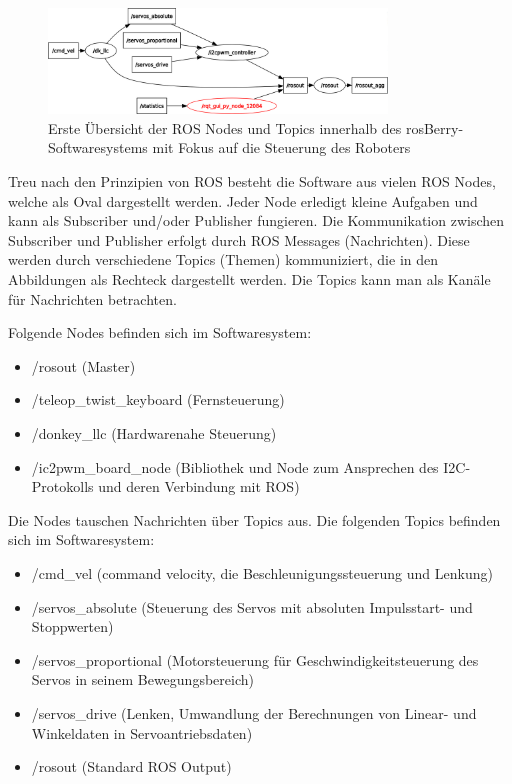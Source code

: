 \documentclass[conference]{IEEEtran}
\begin{document}
	\begin{figure}[!ht] 
		\centering
		\includegraphics[width=9cm]{img/rosgraph.png}
		\caption{Erste Übersicht der ROS Nodes und Topics innerhalb des rosBerry-Softwaresystems mit Fokus auf die Steuerung des Roboters}
		\label{rosgraph}
	\end{figure}
	
	Treu nach den Prinzipien von ROS besteht die Software aus vielen ROS Nodes, welche als Oval dargestellt werden. 
	Jeder Node erledigt kleine Aufgaben und kann als Subscriber und/oder Publisher fungieren.
	Die Kommunikation zwischen Subscriber und Publisher erfolgt durch ROS Messages (Nachrichten).
	Diese werden durch verschiedene Topics (Themen) kommuniziert, die in den Abbildungen als Rechteck dargestellt werden.
	Die Topics kann man als Kanäle für Nachrichten betrachten.
	
	Folgende Nodes befinden sich im Softwaresystem:
	\begin{itemize}
		\item /rosout (Master)
		\item /teleop\_twist\_keyboard (Fernsteuerung)
		\item /donkey\_llc (Hardwarenahe Steuerung)
		\item /ic2pwm\_board\_node (Bibliothek und Node zum Ansprechen des I2C-Protokolls und deren Verbindung mit ROS)
	\end{itemize}
	
	Die Nodes tauschen Nachrichten über Topics aus.
	Die folgenden Topics befinden sich im Softwaresystem:
	\begin{itemize}
		\item /cmd\_vel (command velocity, die Beschleunigungssteuerung und 
		Lenkung)
		\item /servos\_absolute (Steuerung des Servos mit absoluten Impulsstart- und Stoppwerten)
		\item /servos\_proportional (Motorsteuerung für Geschwindigkeitsteuerung des Servos in seinem Bewegungsbereich)
		\item /servos\_drive (Lenken, Umwandlung der Berechnungen von Linear- und Winkeldaten in Servoantriebsdaten)
		\item /rosout (Standard ROS Output)
	\end{itemize}
\end{document}
